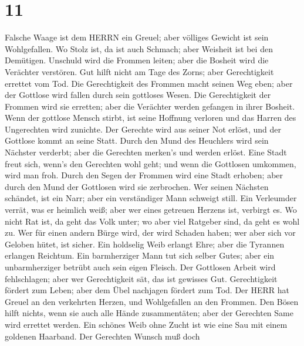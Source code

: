 \hypertarget{section-10}{%
\section{11}\label{section-10}}

 Falsche Waage ist dem HERRN ein Greuel; aber völliges
Gewicht ist sein Wohlgefallen.  Wo Stolz ist, da ist auch
Schmach; aber Weisheit ist bei den Demütigen.  Unschuld wird
die Frommen leiten; aber die Bosheit wird die Verächter verstören.
 Gut hilft nicht am Tage des Zorns; aber Gerechtigkeit
errettet vom Tod.  Die Gerechtigkeit des Frommen macht
seinen Weg eben; aber der Gottlose wird fallen durch sein gottloses
Wesen.  Die Gerechtigkeit der Frommen wird sie erretten;
aber die Verächter werden gefangen in ihrer Bosheit.  Wenn
der gottlose Mensch stirbt, ist seine Hoffnung verloren und das Harren
des Ungerechten wird zunichte.  Der Gerechte wird aus seiner
Not erlöst, und der Gottlose kommt an seine Statt.  Durch
den Mund des Heuchlers wird sein Nächster verderbt; aber die Gerechten
merken's und werden erlöst.  Eine Stadt freut sich, wenn's
den Gerechten wohl geht; und wenn die Gottlosen umkommen, wird man froh.
 Durch den Segen der Frommen wird eine Stadt erhoben; aber
durch den Mund der Gottlosen wird sie zerbrochen.  Wer
seinen Nächsten schändet, ist ein Narr; aber ein verständiger Mann
schweigt still.  Ein Verleumder verrät, was er heimlich
weiß; aber wer eines getreuen Herzens ist, verbirgt es.  Wo
nicht Rat ist, da geht das Volk unter; wo aber viel Ratgeber sind, da
geht es wohl zu.  Wer für einen andern Bürge wird, der wird
Schaden haben; wer aber sich vor Geloben hütet, ist sicher.
 Ein holdselig Weib erlangt Ehre; aber die Tyrannen
erlangen Reichtum.  Ein barmherziger Mann tut sich selber
Gutes; aber ein unbarmherziger betrübt auch sein eigen Fleisch.
 Der Gottlosen Arbeit wird fehlschlagen; aber wer
Gerechtigkeit sät, das ist gewisses Gut.  Gerechtigkeit
fördert zum Leben; aber dem Übel nachjagen fördert zum Tod.
 Der HERR hat Greuel an den verkehrten Herzen, und
Wohlgefallen an den Frommen.  Den Bösen hilft nichts, wenn
sie auch alle Hände zusammentäten; aber der Gerechten Same wird errettet
werden.  Ein schönes Weib ohne Zucht ist wie eine Sau mit
einem goldenen Haarband.  Der Gerechten Wunsch muß doch
